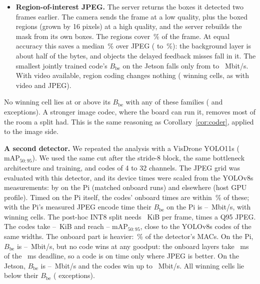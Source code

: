 \begin{itemize}
\item \textbf{Region-of-interest JPEG.} The server returns the boxes it detected two frames earlier. The camera
sends the frame at a low quality, plus the boxed regions (grown by 16 pixels) at a high quality, and the server
rebuilds the mask from its own boxes. The regions cover \VcRoiArea\,\% of the frame. At equal accuracy this saves a
median \VcSaveRoi\,\% over JPEG (\VcSaveRoiMin{} to \VcSaveRoiMax\,\%): the background layer is about half of the
bytes, and objects the delayed feedback misses fall in it. The smallest jointly trained code's $B_{\mathrm{be}}$ on
the Jetson falls only from \VcJpegJointFastBe{} to \VcJpegRoiJointFastBe~Mbit/s. With video available, region coding
changes nothing (\VcAllWins{} winning cells, as with video and JPEG).
\end{itemize}
No winning cell lies at or above its $B_{\mathrm{be}}$ with any of these families (\VcBothExc{} and \LicBothExc{}
exceptions). A stronger image codec, where the board can run it, removes most of the room a split had. This is the
same reasoning as Corollary~\ref{cor:coder}, applied to the image side.

\textbf{A second detector.} We repeated the analysis with a VisDrone YOLO11s (\SdBaseMap{} mAP$_{50:95}$). We used the
same cut after the stride-8 block, the same bottleneck architecture and training, and \SdCodes{} codes of 4 to 32
channels. The JPEG grid was evaluated with this detector, and its device times were scaled from the YOLOv8s
measurements: by \SdPiRatio{} on the Pi (matched onboard runs) and \SdHostRatio{} elsewhere (host GPU profile). Timed
on the Pi itself, the codes' onboard times are within \BpYelevenDev\,\% of these; with the Pi's measured JPEG encode
time their $B_{\mathrm{be}}$ on the Pi is \BpYelevenBeMin--\BpYelevenBeMax~Mbit/s, with \BpYelevenWins{} winning
cells. The
post-hoc INT8 split needs \SdPosthocKib~KiB per frame, \SdPosthocOverQnf{} times a Q95 JPEG. The codes take
\SdCodeKibMin--\SdCodeKibMax~KiB and reach \SdCodeMapMin--\SdCodeMapMax{} mAP$_{50:95}$, close to the YOLOv8s codes of
the same widths. The onboard part is heavier: \SdEdgeFrac\,\% of the detector's MACs. On the Pi, $B_{\mathrm{be}}$ is
\SdPiBeMin--\SdPiBeMax~Mbit/s, but no code wins at any goodput: the onboard layers take \SdPiOnboardMs~ms of the
\SdDeadlineMs~ms deadline, so a code is on time only where JPEG is better. On the Jetson, $B_{\mathrm{be}}$ is
\SdFastBeMin--\SdFastBeMax~Mbit/s and the codes win up to \SdFastWinMax~Mbit/s. All \SdWins{} winning cells lie
below their $B_{\mathrm{be}}$ (\SdExc{} exceptions).

